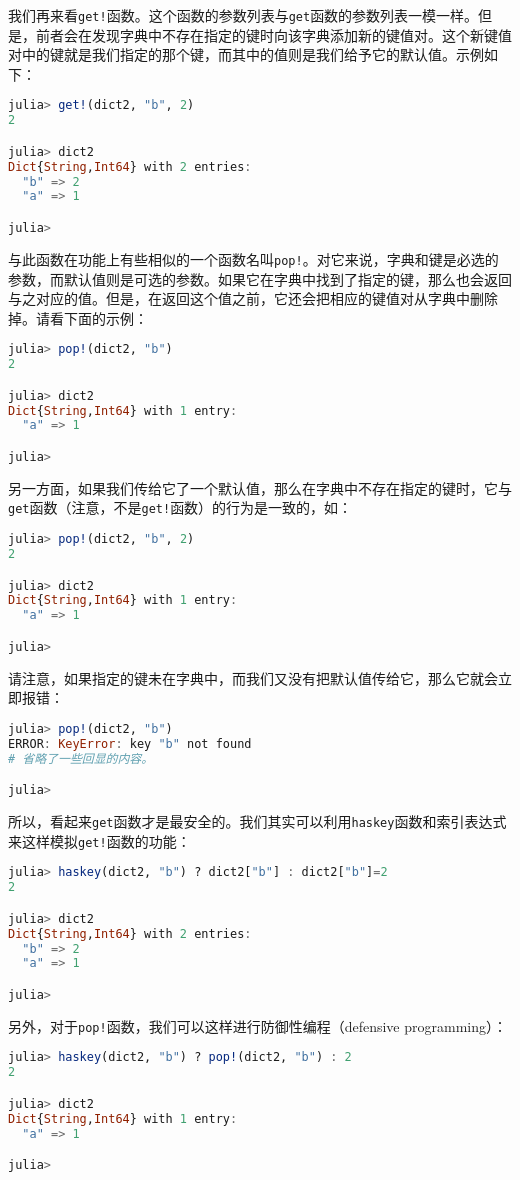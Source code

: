 我们再来看\verb`get!`函数。这个函数的参数列表与\verb`get`函数的参数列表一模一样。但是，前者会在发现字典中不存在指定的键时向该字典添加新的键值对。这个新键值对中的键就是我们指定的那个键，而其中的值则是我们给予它的默认值。示例如下：
\begin{lstlisting}[language=julia]
julia> get!(dict2, "b", 2)
2

julia> dict2
Dict{String,Int64} with 2 entries:
  "b" => 2
  "a" => 1

julia> 
\end{lstlisting}

与此函数在功能上有些相似的一个函数名叫\verb`pop!`。对它来说，字典和键是必选的参数，而默认值则是可选的参数。如果它在字典中找到了指定的键，那么也会返回与之对应的值。但是，在返回这个值之前，它还会把相应的键值对从字典中删除掉。请看下面的示例：
\begin{lstlisting}[language=julia]
julia> pop!(dict2, "b")
2

julia> dict2
Dict{String,Int64} with 1 entry:
  "a" => 1

julia> 
\end{lstlisting}

另一方面，如果我们传给它了一个默认值，那么在字典中不存在指定的键时，它与\verb`get`函数（注意，不是\verb`get!`函数）的行为是一致的，如：
\begin{lstlisting}[language=julia]
julia> pop!(dict2, "b", 2)
2

julia> dict2
Dict{String,Int64} with 1 entry:
  "a" => 1

julia> 
\end{lstlisting}

请注意，如果指定的键未在字典中，而我们又没有把默认值传给它，那么它就会立即报错：
\begin{lstlisting}[language=julia]
julia> pop!(dict2, "b")
ERROR: KeyError: key "b" not found
# 省略了一些回显的内容。

julia> 
\end{lstlisting}

所以，看起来\verb`get`函数才是最安全的。我们其实可以利用\verb`haskey`函数和索引表达式来这样模拟\verb`get!`函数的功能：
\begin{lstlisting}[language=julia]
julia> haskey(dict2, "b") ? dict2["b"] : dict2["b"]=2
2

julia> dict2
Dict{String,Int64} with 2 entries:
  "b" => 2
  "a" => 1

julia> 
\end{lstlisting}

另外，对于\verb`pop!`函数，我们可以这样进行防御性编程（defensive programming）：
\begin{lstlisting}[language=julia]
julia> haskey(dict2, "b") ? pop!(dict2, "b") : 2
2

julia> dict2
Dict{String,Int64} with 1 entry:
  "a" => 1

julia> 
\end{lstlisting}

